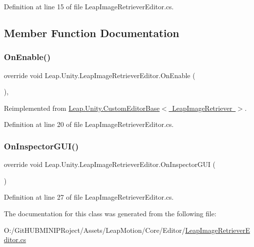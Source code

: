 Definition at line 15 of file Leap\+Image\+Retriever\+Editor.\+cs.



\subsection{Member Function Documentation}
\mbox{\label{class_leap_1_1_unity_1_1_leap_image_retriever_editor_a4219c7044bd7415bd98b7cd697335ab6}} 
\subsubsection{\texorpdfstring{OnEnable()}{OnEnable()}}
{\footnotesize\ttfamily override void Leap.\+Unity.\+Leap\+Image\+Retriever\+Editor.\+On\+Enable (\begin{DoxyParamCaption}{ }\end{DoxyParamCaption})\hspace{0.3cm}{\ttfamily [protected]}, {\ttfamily [virtual]}}



Reimplemented from \mbox{\hyperlink{class_leap_1_1_unity_1_1_custom_editor_base_a2268bc01655342bd3da5ae015bfa2f93}{Leap.\+Unity.\+Custom\+Editor\+Base$<$ Leap\+Image\+Retriever $>$}}.



Definition at line 20 of file Leap\+Image\+Retriever\+Editor.\+cs.

\mbox{\label{class_leap_1_1_unity_1_1_leap_image_retriever_editor_a97415df441592589b7fec378bc15dea3}} 
\subsubsection{\texorpdfstring{OnInspectorGUI()}{OnInspectorGUI()}}
{\footnotesize\ttfamily override void Leap.\+Unity.\+Leap\+Image\+Retriever\+Editor.\+On\+Inspector\+G\+UI (\begin{DoxyParamCaption}{ }\end{DoxyParamCaption})}



Definition at line 27 of file Leap\+Image\+Retriever\+Editor.\+cs.



The documentation for this class was generated from the following file\+:\begin{DoxyCompactItemize}
\item 
O\+:/\+Git\+H\+U\+B\+M\+I\+N\+I\+P\+Roject/\+Assets/\+Leap\+Motion/\+Core/\+Editor/\mbox{\hyperlink{_leap_image_retriever_editor_8cs}{Leap\+Image\+Retriever\+Editor.\+cs}}\end{DoxyCompactItemize}

